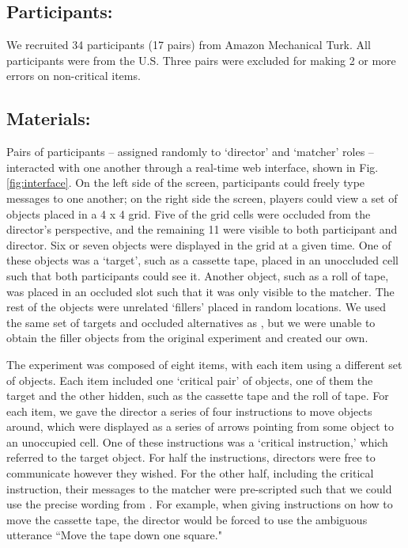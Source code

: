 \documentclass[10pt,letterpaper]{article}
\begin{document}
\subsection{Participants:}

We recruited 34 participants (17 pairs) from Amazon Mechanical Turk. All participants were from the U.S. Three pairs were excluded for making 2 or more errors on non-critical items.

\subsection{Materials:}

Pairs of participants -- assigned randomly to `director' and `matcher' roles -- interacted with one another through a real-time web interface, shown in Fig. \ref{fig:interface}. On the left side of the screen, participants could freely type messages to one another; on the right side the screen, players could view a set of objects placed in a 4 x 4 grid. Five of the grid cells were occluded from the director's perspective, and the remaining 11 were visible to both participant and director. Six or seven objects were displayed in the grid at a given time. One of these objects was a `target', such as a cassette tape, placed in an unoccluded cell such that both participants could see it. Another object, such as a roll of tape, was placed in an occluded slot such that it was only visible to the matcher. The rest of the objects were unrelated `fillers' placed in random locations. We used the same set of targets and occluded alternatives as , but we were unable to obtain the filler objects from the original experiment and created our own.

The experiment was composed of eight items, with each item using a different set of objects. Each item included one `critical pair' of objects, one of them the target and the other hidden, such as the cassette tape and the roll of tape. For each item, we gave the director a series of four instructions to move objects around, which were displayed as a series of arrows pointing from some object to an unoccupied cell. One of these instructions was a `critical instruction,' which referred to the target object. For half the instructions, directors were free to communicate however they wished. For the other half, including the critical instruction, their messages to the matcher were pre-scripted such that we could use the precise wording from . For example, when giving instructions on how to move the cassette tape, the director would be forced to use the ambiguous utterance ``Move the tape down one square." 
\end{document}
